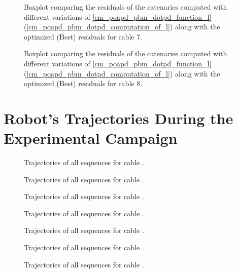 \begin{figure}[H]
	\centering
	\caption{
		Boxplot comparing the residuals of the catenaries computed with different variations of
		\cref{cm_poapd_pbm_dotpd_function_l} (\cref{cm_poapd_pbm_dotpd_computation_of_l}) along with the
		optimized (Best) residuals for cable 7.
	}
	\label{af_aoddacm_dynamics_cable_7_boxplot_compare}
\end{figure}
\begin{figure}[H]
	\centering
	\caption{
		Boxplot comparing the residuals of the catenaries computed with different variations of
		\cref{cm_poapd_pbm_dotpd_function_l} (\cref{cm_poapd_pbm_dotpd_computation_of_l}) along with the
		optimized (Best) residuals for cable 8.
	}
	\label{af_aoddacm_dynamics_cable_8_boxplot_compare}
\end{figure}

\section{Robot's Trajectories During the Experimental Campaign}
\label{af_robots_trajectories_during_the_experimental_campaign}

\begin{figure}[H]
	\centering
	\caption{Trajectories of all sequences for cable .}
	\label{af_rtdtec_trajectory_1}
\end{figure}
\begin{figure}
	\centering
	\caption{Trajectories of all sequences for cable .}
	\label{af_rtdtec_trajectory_2}
\end{figure}
\begin{figure}
	\centering
	\caption{Trajectories of all sequences for cable .}
	\label{af_rtdtec_trajectory_3}
\end{figure}
\begin{figure}
	\centering
	\caption{Trajectories of all sequences for cable .}
	\label{af_rtdtec_trajectory_4}
\end{figure}
\begin{figure}
	\centering
	\caption{Trajectories of all sequences for cable .}
	\label{af_rtdtec_trajectory_5}
\end{figure}
\begin{figure}
	\centering
	\caption{Trajectories of all sequences for cable .}
	\label{af_rtdtec_trajectory_7}
\end{figure}
\begin{figure}
	\centering
	\caption{Trajectories of all sequences for cable .}
	\label{af_rtdtec_trajectory_8}
\end{figure}
